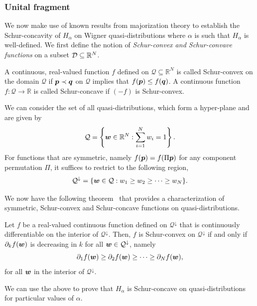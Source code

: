 \documentclass[pra,
aps,
twocolumn,
superscriptaddress,
groupedaddress,
nofootinbib,
reprint
]{revtex4-1}
\begin{document}
\subsubsection{Unital fragment}

We now make use of known results from majorization theory to establish the Schur-concavity of $H_\alpha$ on Wigner quasi-distributions where $\alpha$ is such that $H_\alpha$ is well-defined. 
We first define the notion of \emph{Schur-convex and Schur-convave functions} on a subset ${\mathcal D} \subseteq \mathbb{R}^N$.

\begin{definition} 
A continuous, real-valued function $f$ defined on $\mathcal{Q} \subseteq \mathbb{R}^N$ is called Schur-convex on the domain $\mathcal{Q}$ if $\boldsymbol{p} \prec \boldsymbol{q}$ on $\mathcal{Q}$ implies that $f(\boldsymbol{p}) \le f(\boldsymbol{q})$. A continuous function $f:\mathcal{Q} \rightarrow \mathbb{R}$ is called Schur-concave if $(-f)$ is Schur-convex.
\end{definition}
We can consider the set of all quasi-distributions, which form a hyper-plane and are given by
\begin{equation}
\mathcal{Q} = \left\{ \boldsymbol{w} \in \mathbb{R}^N: \sum_{i=1}^N w_i = 1 \right\}.
\end{equation}
For functions that are symmetric, namely $f(\boldsymbol{p}) = f(\Pi \boldsymbol{p})$ for any component permutation $\Pi$, it suffices to restrict to the following region,
\begin{equation}
\mathcal{Q}^\downarrow = \{ \boldsymbol{w} \in \mathcal{Q} : w_1 \ge w_2 \ge \cdots \ge w_N\}.
\end{equation}

We now have the following theorem~\cite{cit:marshall} that provides a characterization of symmetric, Schur-convex and Schur-concave functions on quasi-distributions.
\begin{lemma}
Let $f$ be a real-valued continuous function defined on $\mathcal{Q}^\downarrow$ that is continuously differentiable on the interior of $\mathcal{Q}^\downarrow$. 
Then, $f$ is Schur-convex on $\mathcal{Q}^\downarrow$ if and only if $\partial_k f(\boldsymbol{w})$ is decreasing in $k$ for all $\boldsymbol{w} \in \mathcal{Q}^\downarrow$, namely
\begin{equation}
\partial_1 f(\boldsymbol{w}) \ge \partial_2 f(\boldsymbol{w}) \ge \cdots \ge \partial_N f(\boldsymbol{w}),
\end{equation}
for all $\boldsymbol{w}$ in the interior of $\mathcal{Q}^\downarrow$.
\end{lemma}

We can use the above to prove that $H_\alpha$ is Schur-concave on quasi-distributions for particular values of $\alpha$.
\end{document}

